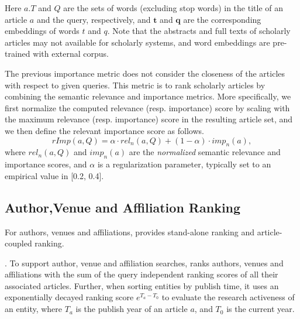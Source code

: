 Here $a.T$ and $Q$ are the sets of words (excluding stop words) in the title of an article $a$ and the query, respectively, %
and $\textbf{t}$ and $\textbf{q}$ are the corresponding embeddings of words $t$ and $q$.
Note that the abstracts and full texts of scholarly articles may not available for scholarly systems, and word embeddings are pre-trained with external corpus.




 The previous importance metric does not consider the closeness of the articles with respect to given queries. This metric is to rank scholarly articles by combining the semantic relevance and importance metrics. More specifically, we first normalize the computed relevance (resp. importance) score by scaling with the maximum relevance (resp. importance) score in the resulting article set, and we then define the relevant importance score as follows.
\begin{equation}
\label{eq:relimp}
rImp(a, Q) = \alpha \cdot rel_n(a, Q) + (1-\alpha)\cdot imp_n(a),
\end{equation}
where $rel_n(a, Q)$ and $imp_n(a)$ are the {\em normalized} semantic relevance and importance scores, and $\alpha$ is a regularization parameter,
typically set to an empirical value in [0.2, 0.4].



\subsection{Author,Venue and Affiliation Ranking}
\label{subsec:heteroRanking}

For authors, venues and affiliations,  \oursystem provides stand-alone ranking and article-coupled ranking.

. To support author, venue and affiliation searches, \oursystem ranks authors, venues and affiliations with the sum of the query independent ranking scores of all their associated articles. Further, when sorting entities by publish time, it uses an exponentially decayed ranking score $e^{T_a-T_0}$ to evaluate the research activeness of an entity, where $T_a$ is the publish year of an article $a$, and $T_0$ is the current year.

